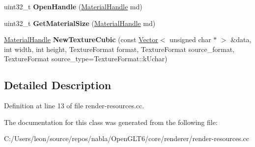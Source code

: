 \begin{DoxyCompactItemize}
\item 
\mbox{\label{classnabla_1_1renderer_1_1_material_manger_a89a24e4f7438b5c425c97f04b945bba2}} 
uint32\+\_\+t {\bfseries Open\+Handle} (\mbox{\hyperlink{classnabla_1_1renderer_1_1_handle}{Material\+Handle}} md)
\item 
\mbox{\label{classnabla_1_1renderer_1_1_material_manger_a433ed499a5ad2e8f75a8326d7b90e9b4}} 
uint32\+\_\+t {\bfseries Get\+Material\+Size} (\mbox{\hyperlink{classnabla_1_1renderer_1_1_handle}{Material\+Handle}} md)
\item 
\mbox{\label{classnabla_1_1renderer_1_1_material_manger_af4629edb5b060fe6193becfa207eacb4}} 
\mbox{\hyperlink{classnabla_1_1renderer_1_1_handle}{Material\+Handle}} {\bfseries New\+Texture\+Cubic} (const \mbox{\hyperlink{classnabla_1_1_s_t_l_vector_ex}{Vector}}$<$ unsigned char $\ast$ $>$ \&data, int width, int height, Texture\+Format format, Texture\+Format source\+\_\+format, Texture\+Format source\+\_\+type=Texture\+Format\+::k\+Uchar)
\end{DoxyCompactItemize}


\subsection{Detailed Description}


Definition at line 13 of file render-\/resources.\+cc.



The documentation for this class was generated from the following file\+:\begin{DoxyCompactItemize}
\item 
C\+:/\+Users/leon/source/repos/nabla/\+Open\+G\+L\+T6/core/renderer/render-\/resources.\+cc\end{DoxyCompactItemize}
